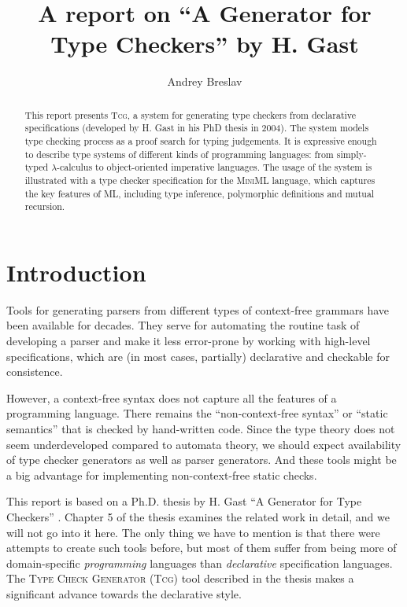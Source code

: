 \documentclass[a4paper,12pt]{article}
\title{A report on ``A Generator for Type Checkers'' by H. Gast}
\author{Andrey Breslav}
\newcommand{\Tcg}{\textsc{Tcg}}
\begin{document}
\maketitle

\begin{abstract}
	This report presents \Tcg{}, a system for generating type checkers from declarative specifications (developed by H. Gast in his PhD thesis in 2004). The system models type checking process as a proof search for typing judgements. It is expressive enough to describe type systems of different kinds of programming languages: from simply-typed $\lambda$\mbox{-}calculus to object-oriented imperative languages. The usage of the system is illustrated with a type checker specification for the \textsc{MiniML} language, which captures the key features of ML, including type inference, polymorphic definitions and mutual recursion. 
\end{abstract}

\section{Introduction}

Tools for generating parsers from different types of context-free grammars have been available for decades. They serve for automating the routine task of developing a parser and make it less error-prone by working with high-level specifications, which are (in most cases, partially) declarative and checkable for consistence.

However, a context-free syntax does not capture all the features of a programming language. There remains the ``non-context-free syntax'' or ``static semantics'' that is checked by hand-written code. Since the type theory does not seem underdeveloped compared to automata theory, we should expect availability of type checker generators as well as parser generators. And these tools might be a big advantage for implementing non-context-free static checks.

This report is based on a Ph.D. thesis by H. Gast ``A Generator for Type Checkers'' \cite{Tcg}. Chapter 5 of the thesis examines the related work in detail, and we will not go into it here. The only thing we have to mention is that there were attempts to create such tools before, but most of them suffer from being more of domain-specific \emph{programming} languages than \emph{declarative} specification languages. The \textsc{Type Check Generator} (\Tcg{}) tool described in the thesis makes a significant advance towards the declarative style.
\end{document}
